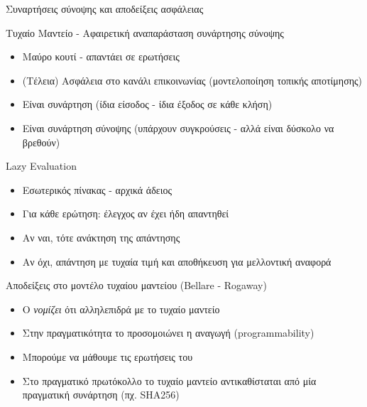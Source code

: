 \documentclass[handout]{beamer}
\begin{document}
\begin{frame}[allowframebreaks]{Συναρτήσεις σύνοψης και αποδείξεις ασφάλειας}

\begin{block}{Τυχαίο Μαντείο - Αφαιρετική αναπαράσταση συνάρτησης σύνοψης}
\begin{itemize}
\item Μαύρο κουτί - απαντάει σε ερωτήσεις
\item (Τέλεια) Ασφάλεια στο κανάλι επικοινωνίας (μοντελοποίηση τοπικής αποτίμησης)
\item Είναι συνάρτηση (ίδια είσοδος - ίδια έξοδος σε κάθε κλήση)
\item Είναι συνάρτηση σύνοψης (υπάρχουν συγκρούσεις - αλλά είναι δύσκολο να βρεθούν)
\end{itemize}
\end{block}

\framebreak

\begin{block}{Lazy Evaluation}
\begin{itemize}
\item Εσωτερικός πίνακας - αρχικά άδειος
\item Για κάθε ερώτηση: έλεγχος αν έχει ήδη απαντηθεί
\item Αν ναι, τότε ανάκτηση της απάντησης
\item Αν όχι, απάντηση με τυχαία τιμή και αποθήκευση για μελλοντική αναφορά
\end{itemize}
\end{block}
\framebreak

Αποδείξεις στο μοντέλο τυχαίου μαντείου (Bellare - Rogaway)
\begin{itemize}
\item Ο \adv \emph{νομίζει} ότι αλληλεπιδρά με το τυχαίο μαντείο
\item Στην πραγματικότητα το προσομοιώνει η αναγωγή (programmability)
\item Μπορούμε να μάθουμε τις ερωτήσεις του \adv
\item Στο πραγματικό πρωτόκολλο το τυχαίο μαντείο αντικαθίσταται από μία πραγματική συνάρτηση (πχ. SHA256)
\end{itemize}

\framebreak

\end{frame}
\end{document}

